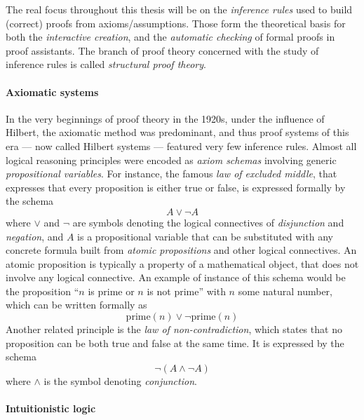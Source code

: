 \begin{emphpar}
The real focus throughout this thesis will be on the \emph{inference rules} used
to build (correct) proofs from axioms/assumptions. Those form the theoretical
basis for both the \emph{interactive creation}, and the \emph{automatic
checking} of formal proofs in proof assistants. The branch of proof theory
concerned with the study of inference rules is called \emph{structural proof
theory}.
\end{emphpar}

\paragraph{Axiomatic systems} 

In the very beginnings of proof theory in the 1920s, under the influence of
Hilbert, the axiomatic method was predominant, and thus proof systems of this
era --- now called Hilbert systems --- featured very few inference rules. Almost
all logical reasoning principles were encoded as \emph{axiom schemas} involving
generic \emph{propositional variables}. For instance, the famous \emph{law of
excluded middle}, that expresses that every proposition is either true or false,
is expressed formally by the schema
$$A \lor \neg A$$
where $\lor$ and $\neg$ are symbols denoting the logical connectives of
\emph{disjunction} and \emph{negation}, and $A$ is a propositional variable that
can be substituted with any concrete formula built from \emph{atomic
propositions} and other logical connectives. An atomic proposition is typically
a property of a mathematical object, that does not involve any logical
connective. An example of instance of this schema would be the proposition ``$n$
is prime or $n$ is not prime'' with $n$ some natural number, which can be
written formally as
$$\mathrm{prime}(n) \lor \neg\mathrm{prime}(n)$$
Another related principle is the \emph{law of non-contradiction}, which states
that no proposition can be both true and false at the same time. It is expressed
by the schema
$$\neg (A \land \neg A)$$
where $\land$ is the symbol denoting \emph{conjunction}.

\paragraph{Intuitionistic logic}


